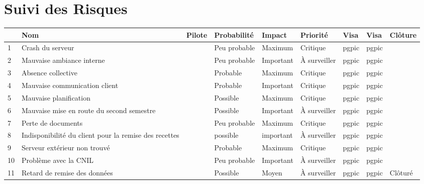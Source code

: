 \documentclass[asi]{picInsa}
\begin{document}
\chapter*{Suivi des Risques}
\begin{longtable}{|p{0.3cm}|p{2.5cm}|p{2cm}|p{2cm}|p{1.8cm}|p{1.5cm}|p{1cm}|p{1cm}|p{1.5cm}|}
			\hline
			\rowcolor{gray!40}
			\No & Nom & Pilote & Probabilité & Impact & Priorité & Visa \RQCourt{} & Visa \CPCourt{} & Clôture \\\hline
			
			 1 & Crash du serveur & \Matthieu & Peu probable & Maximum & Critique & pgpic & pgpic & \\\hline
			 
			 2 & Mauvaise ambiance interne & \Michel & Peu probable & Important & À surveiller & pgpic & pgpic & \\\hline
			 
			 3 & Absence collective & \Pierre & Probable & Maximum & Critique & pgpic & pgpic & \\\hline
			 
			 4 & Mauvaise communication client & \Julie & Probable & Important & Critique & pgpic & pgpic & \\\hline
			 
			 5 & Mauvaise planification & \Florian & Possible & Maximum & Critique & pgpic & pgpic & \\\hline
			 
			 6 & Mauvaise mise en route du second semestre & \Melissa & Possible & Important & À surveiller & pgpic & pgpic & \\\hline
			 
			 7 & Perte de documents & \Mathieu & Peu probable & Maximum & Critique & pgpic & pgpic & \\\hline
			 
			 8 & Indisponibilité du client pour la remise des recettes & \Julie & possible & important & À surveiller & pgpic & pgpic & \\\hline
			 
			 9 & Serveur extérieur non trouvé & \Matthieu & Probable & Maximum & Critique & pgpic & pgpic & \\\hline
			 
			 10 & Problème avec la CNIL & \Pierre & Peu probable & Important & À surveiller & pgpic & pgpic & \\\hline
			 
			 11 & Retard de remise des données & \Sergi & Possible & Moyen & À surveiller & pgpic & pgpic & Clôturé \\\hline
			 

\end{longtable}
\end{document}
